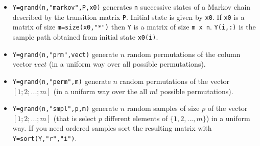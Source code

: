 \begin{description}
\begin{itemize}
\item {} 
  \verb!Y=grand(n,"markov",P,x0)! generates \verb!n! successive states of a Markov chain 
  described  by the transition matrix \verb!P!. Initial state is  given by 
  \verb!x0!. If \verb!x0! is a matrix of size \verb!m=size(x0,"*")! 
  then \verb!Y! is a matrix of size \verb!m x n!. \verb!Y(i,:)! is the sample 
  path  obtained from initial state \verb!x0(i)!.

\item {} \verb!Y=grand(n,"prm",vect)! generate $n$ random permutations of the
  column vector $vect$ (in a uniform way over all possible permutations).

\item {}
  \verb!Y=grand(n,"perm",m)! generate $n$ random permutations of the
  vector $[1;2;...;m]$ (in a uniform way over the all $m!$ possible permutations).

\item {}
  \verb!Y=grand(n,"smpl",p,m)! generate $n$ random samples of size $p$
  of the vector $[1;2;...;m]$ (that is select $p$ different elements
  of $\{1,2,...,m\}$) in a uniform way. If you need ordered samples
  sort the resulting matrix with \verb!Y=sort(Y,"r","i")!.

\end{itemize}

\end{description}


